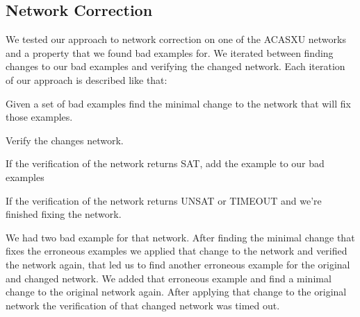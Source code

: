 \documentclass{easychair}
\begin{document}
\subsection{Network Correction}

We tested our approach to network correction on one of the ACASXU networks and a property that we found bad examples for. We iterated between finding changes to our bad examples and verifying the changed network. Each iteration of our approach is described like that:
\begin{list}{•}{}
\item Given a set of bad examples find the minimal change to the network that will fix those examples. 
\item Verify the changes network.
\begin{list}{•}{}
\item If the verification of the network returns SAT, add the example to our bad examples
\item If the verification of the network returns UNSAT or TIMEOUT and we're finished fixing the network.
\end{list}
\end{list}  

We had two bad example for that network. After finding the minimal change that fixes the erroneous examples we applied that change to the network and verified the network again, that led us to find another erroneous example for the original and changed network. 
We added that erroneous example and find a minimal change to the original network again. After applying that change to the original network the verification of that changed network was timed out.
\end{document}
